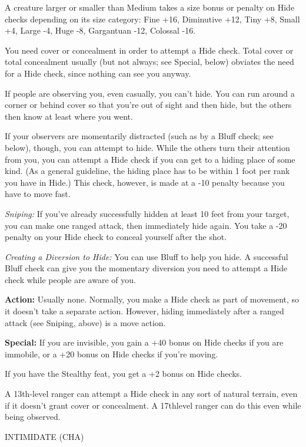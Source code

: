 \documentclass{article}
\begin{document}
A creature larger or smaller than Medium takes a size bonus or penalty on Hide 
checks depending on its size category: Fine +16, Diminutive +12, Tiny +8, Small 
+4, Large -4, Huge -8, Gargantuan -12, Colossal -16.

You need cover or concealment in order to attempt a Hide check. Total cover or 
total concealment usually (but not always; see Special, below) obviates the need 
for a Hide check, since nothing can see you anyway.

If people are observing you, even casually, you can't hide. You can run around 
a corner or behind cover so that you're out of sight and then hide, but the others 
then know at least where you went.

If your observers are momentarily distracted (such as by a Bluff check; see below), 
though, you can attempt to hide. While the others turn their attention from you, 
you can attempt a Hide check if you can get to a hiding place of some kind. (As 
a general guideline, the hiding place has to be within 1 foot per rank you have 
in Hide.) This check, however, is made at a -10 penalty because you have to move 
fast.

\textit{Sniping: }If you've already successfully hidden at least 10 feet from your 
target, you can make one ranged attack, then immediately hide again. You take a 
-20 penalty on your Hide check to conceal yourself after the shot.

\textit{Creating a Diversion to Hide: }You can use Bluff to help you hide. A successful 
Bluff check can give you the momentary diversion you need to attempt a Hide check 
while people are aware of you.

\textbf{Action:} Usually none. Normally, you make a Hide check as part of movement, 
so it doesn't take a separate action. However, hiding immediately after a ranged 
attack (see Sniping, above) is a move action.

\textbf{Special:} If you are invisible, you gain a +40 bonus on Hide checks if 
you are immobile, or a +20 bonus on Hide checks if you're moving.

If you have the Stealthy feat, you get a +2 bonus on Hide checks.

A 13th-level ranger can attempt a Hide check in any sort of natural terrain, even 
if it doesn't grant cover or concealment. A 17thlevel ranger can do this even while 
being observed.

\vspace{12pt}
INTIMIDATE (CHA)
\end{document}
